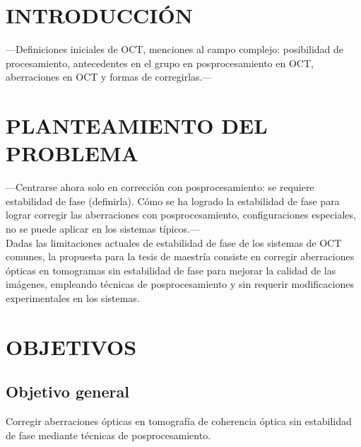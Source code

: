 \documentclass[letter, 12 pt]{article}
\begin{document}
\section{INTRODUCCIÓN}

---Definiciones iniciales de OCT, menciones al campo complejo: posibilidad de procesamiento, antecedentes en el grupo en posprocesamiento en OCT, aberraciones en OCT y formas de corregirlas.---


\section{PLANTEAMIENTO DEL PROBLEMA}

---Centrarse ahora solo en corrección con posprocesamiento: se requiere estabilidad de fase (definirla). Cómo se ha logrado la estabilidad de fase para lograr corregir las aberraciones con posprocesamiento, configuraciones especiales, no se puede aplicar en los sistemas típicos.--- \\

Dadas las limitaciones actuales de estabilidad de fase de los sistemas de OCT comunes, la propuesta para la tesis de maestría consiste en corregir aberraciones ópticas en tomogramas sin estabilidad de fase para mejorar la calidad de las imágenes, empleando técnicas de posprocesamiento y sin requerir modificaciones experimentales en los sistemas. \\


\section{OBJETIVOS}


\subsection{Objetivo general}

Corregir aberraciones ópticas en tomografía de coherencia óptica sin estabilidad de fase mediante técnicas de posprocesamiento.

\end{document}
